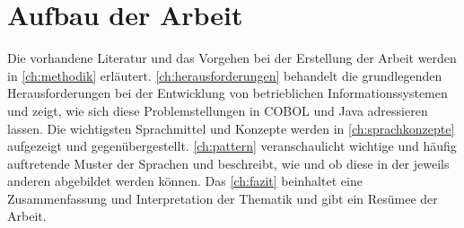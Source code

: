 \section{Aufbau der Arbeit}

Die vorhandene Literatur und das Vorgehen bei der Erstellung der Arbeit werden in \autoref{ch:methodik} erläutert. \autoref{ch:herausforderungen} behandelt die grundlegenden Herausforderungen bei der Entwicklung von betrieblichen Informationssystemen und zeigt, wie sich diese Problemstellungen in COBOL und Java adressieren lassen. Die wichtigsten Sprachmittel und Konzepte werden in \autoref{ch:sprachkonzepte} aufgezeigt und gegenübergestellt. \autoref{ch:pattern} veranschaulicht wichtige und häufig auftretende Muster der Sprachen und beschreibt, wie und ob diese in der jeweils anderen abgebildet werden können. Das \autoref{ch:fazit} beinhaltet eine Zusammenfassung und Interpretation der Thematik und gibt ein Re­sü­mee der Arbeit.